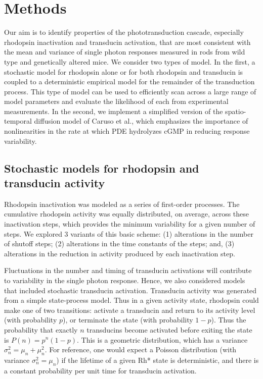 \documentclass[12pt]{article}
\begin{document}

\section{Methods}

Our aim is to identify properties of the phototransduction cascade, especially rhodopsin inactivation and transducin activation, that are most consistent with the mean and variance of single photon responses measured in rods from wild type and genetically altered mice.    We consider two types of model.  In the first, a stochastic model for rhodopsin alone or for both rhodopsin and transducin is coupled to a deterministic empirical model for the remainder of the transduction process.  This type of model can be used to efficiently scan across a large range of model parameters and evaluate the likelihood of each from experimental measurements.  In the second, we implement a simplified version of the spatio-temporal diffusion model of Caruso et al., which emphasizes the importance of nonlinearities in the rate at which PDE hydrolyzes cGMP in reducing response variability.

\subsection{Stochastic models for rhodopsin and transducin activity}

Rhodopsin inactivation was modeled as a series of first-order processes.  The cumulative rhodopsin activity was equally distributed, on average, across these inactivation steps, which provides the minimum variability for a given number of steps.  We explored 3 variants of this basic scheme: (1) alterations in the number of shutoff steps; (2) alterations in the time constants of the steps; and, (3) alterations in the reduction in activity produced by each inactivation step.  

Fluctuations in the number and timing of transducin activations will contribute to variability in the single photon response.  Hence, we also considered models that included stochastic transducin activation.  Transducin activity was generated from a simple state-process model.  Thus in a given activity state, rhodopsin could make one of two transitions: activate a transducin and return to its activity level (with probability $p$), or terminate the state (with probability $1-p$).   Thus the probability that exactly $n$ transducins become activated before exiting the state is $P(n) = p^n (1-p)$.  This is a geometric distribution, which has a variance $\sigma_n^2 = \mu_n + \mu_n^2$.  For reference, one would expect a Poisson distribution (with variance $\sigma_n^2 = \mu_n$) if the lifetime of a given Rh* state is deterministic, and there is a constant probability per unit time for transducin activation.
\end{document}
